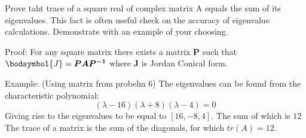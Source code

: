 Prove taht trace of a square real of complex matrix A equals the sum of its eigenvalues. This fact is often useful check on the accuracy of eigenvalue calculations. Demonstrate with an example of your choosing.


Proof:
For any square matrix there exists a matrix $\boldsymbol{P}$ such that $\bodsymbol{J}=\boldsymbol{P}\boldsymbol{A}\boldsymbol{P^{-1}}$ where $\boldsymbol{J}$ is Jordan Conical form. 

Example: (Using matrix from probelm 6)
The eigenvalues can be found from the characteristic polynomial:
\begin{equation*}
	\left(\lambda-16\right)\left(\lambda+8\right)\left(\lambda-4\right)=0
\end{equation*}
Giving rise to the eigenvalues to be equal to $\left[16, -8, 4\right]$. The sum of which is $12$
The trace of a matrix is the sum of the diagonals, for which $tr\left(A\right)=12$.
